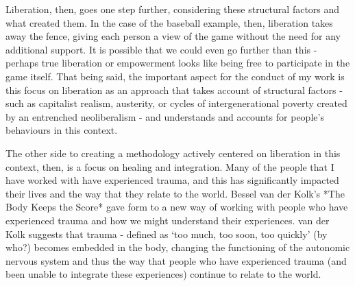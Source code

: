 Liberation, then, goes one step further, considering these structural factors and what created them. In the case of the baseball example, then, liberation takes away the fence, giving each person a view of the game without the need for any additional support. It is possible that we could even go further than this - perhaps true liberation or empowerment looks like being free to participate in the game itself. That being said, the important aspect for the conduct of my work is this focus on liberation as an approach that takes account of structural factors - such as capitalist realism, austerity, or cycles of intergenerational poverty created by an entrenched neoliberalism - and understands and accounts for people’s behaviours in this context. 

The other side to creating a methodology actively centered on liberation in this context, then, is a focus on healing and integration. Many of the people that I have worked with have experienced trauma, and this has significantly impacted their lives and the way that they relate to the world. Bessel van der Kolk’s *The Body Keeps the Score* gave form to a new way of working with people who have experienced trauma and how we might understand their experiences. van der Kolk suggests that trauma - defined as ‘too much, too soon, too quickly’ (by who?) becomes embedded in the body, changing the functioning of the autonomic nervous system and thus the way that people who have experienced trauma (and been unable to integrate these experiences) continue to relate to the world. 




























